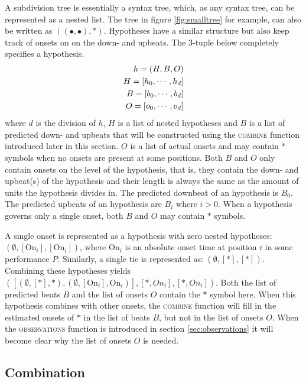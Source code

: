 A subdivision tree is essentially a syntax tree, which, as any syntax tree, can be represented as a nested list. The tree in figure \ref{fig:smalltree} for example, can also be written as $((\bullet, \bullet), *)$. Hypotheses have a similar structure but also keep track of onsets on on the down- and upbeats. The 3-tuple below completely specifies a hypothesis.
\begin{align}
h = (H, B, O)\\ \notag
H = [h_0, \cdots, h_d]\\ \notag
B = [b_0, \cdots, b_d]\\ \notag
O = [o_0, \cdots, o_d] \notag
\end{align}
where $d$ is the division of $h$, $H$ is a list of nested hypotheses and $B$ is a list of predicted down- and upbeats that will be constructed using the \textsc{combine} function introduced later in this section. $O$ is a list of actual onsets and may contain $*$ symbols when no onsets are present at some positions. Both $B$ and $O$ only contain onsets on the level of the hypothesis, that is, they contain the down- and upbeat(s) of the hypothesis and their length is always the same as the amount of units the hypothesis divides in. The predicted downbeat of an hypothesis is $B_0$. The predicted upbeats of an hypothesis are $B_i$ where $i > 0$. When a hypothesis governs only a single onset, both $B$ and $O$ may contain $*$ symbols.

A single onset is represented as a hypothesis with zero nested hypotheses: $(\emptyset, [\textrm{On}_i], [\textrm{On}_i])$, where $\textrm{On}_i$ is an absolute onset time at position $i$ in some performance $P$. Similarly, a single tie is represented as: $(\emptyset, [*], [*])$. Combining these hypotheses yields $([(\emptyset, [*], *), (\emptyset, [\textrm{On}_i], \textrm{On}_i)], [*, On_i], [*, On_i])$. Both the list of predicted beats $B$ and the list of onsets $O$ contain the $*$ symbol here. When this hypothesis combines with other onsets, the \textsc{combine} function will fill in the estimated onsets of $*$ in the list of beats $B$, but not in the list of onsets $O$. When the \textsc{observations} function is introduced in section \ref{sec:observations} it will become clear why the list of onsets $O$ is needed.

\subsection{Combination}
\label{sec:combination}

